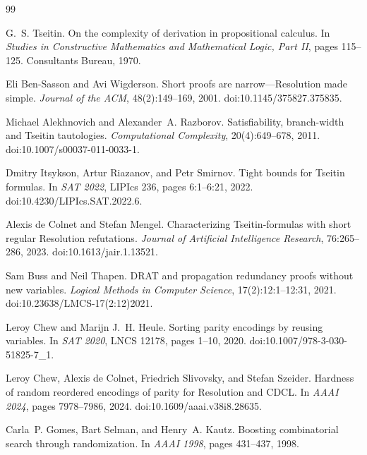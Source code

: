 \documentclass[11pt]{article}
\begin{document}
\begin{thebibliography}{99}

G.~S. Tseitin.
\newblock On the complexity of derivation in propositional calculus.
\newblock In \emph{Studies in Constructive Mathematics and Mathematical Logic, Part II}, pages 115--125. Consultants Bureau, 1970.

Eli Ben-Sasson and Avi Wigderson.
\newblock Short proofs are narrow---Resolution made simple.
\newblock \emph{Journal of the ACM}, 48(2):149--169, 2001.
\newblock doi:10.1145/375827.375835.

Michael Alekhnovich and Alexander~A. Razborov.
\newblock Satisfiability, branch-width and Tseitin tautologies.
\newblock \emph{Computational Complexity}, 20(4):649--678, 2011.
\newblock doi:10.1007/s00037-011-0033-1.

Dmitry Itsykson, Artur Riazanov, and Petr Smirnov.
\newblock Tight bounds for Tseitin formulas.
\newblock In \emph{SAT 2022}, LIPIcs 236, pages 6:1--6:21, 2022.
\newblock doi:10.4230/LIPIcs.SAT.2022.6.

Alexis de Colnet and Stefan Mengel.
\newblock Characterizing Tseitin-formulas with short regular Resolution refutations.
\newblock \emph{Journal of Artificial Intelligence Research}, 76:265--286, 2023.
\newblock doi:10.1613/jair.1.13521.

Sam Buss and Neil Thapen.
\newblock DRAT and propagation redundancy proofs without new variables.
\newblock \emph{Logical Methods in Computer Science}, 17(2):12:1--12:31, 2021.
\newblock doi:10.23638/LMCS-17(2:12)2021.

Leroy Chew and Marijn J.~H. Heule.
\newblock Sorting parity encodings by reusing variables.
\newblock In \emph{SAT 2020}, LNCS 12178, pages 1--10, 2020.
\newblock doi:10.1007/978-3-030-51825-7\_1.

Leroy Chew, Alexis de Colnet, Friedrich Slivovsky, and Stefan Szeider.
\newblock Hardness of random reordered encodings of parity for Resolution and CDCL.
\newblock In \emph{AAAI 2024}, pages 7978--7986, 2024.
\newblock doi:10.1609/aaai.v38i8.28635.

Carla~P. Gomes, Bart Selman, and Henry~A. Kautz.
\newblock Boosting combinatorial search through randomization.
\newblock In \emph{AAAI 1998}, pages 431--437, 1998.


\end{thebibliography}
\end{document}
